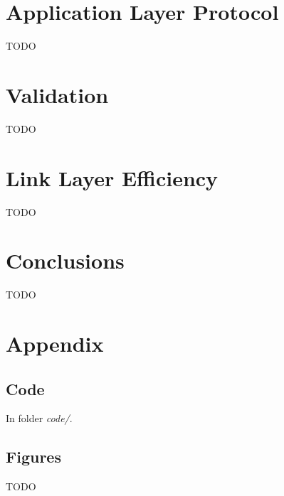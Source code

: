 \documentclass[11pt,a4paper]{article}
\begin{document}
\section{Application Layer Protocol}

TODO

\section{Validation}

TODO

\section{Link Layer Efficiency}

TODO

\section{Conclusions}

TODO

\pagebreak
\appendix
\section{Appendix}

\subsection{Code}

In folder \textit{code/}.

\subsection{Figures}

TODO
\end{document}
